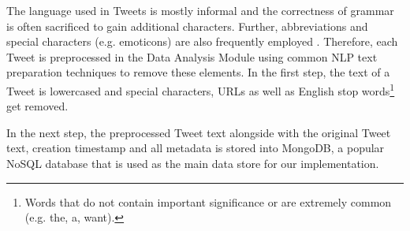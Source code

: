 The language used in Tweets is mostly informal and the correctness of grammar is often sacrificed to gain additional characters. Further, abbreviations and special characters (e.g. emoticons) are also frequently employed \cite[67]{TwitterDataAnalytics2013}. Therefore, each Tweet is preprocessed in the Data Analysis Module using common NLP text preparation techniques to remove these elements. In the first step, the text of a Tweet is lowercased and special characters, URLs as well as English stop words\footnote{Words that do not contain important significance or are extremely common (e.g. the, a, want).} get removed.

In the next step, the preprocessed Tweet text alongside with the original Tweet text, creation timestamp and all metadata is stored into MongoDB, a popular NoSQL database that is used as the main data store for our implementation.
